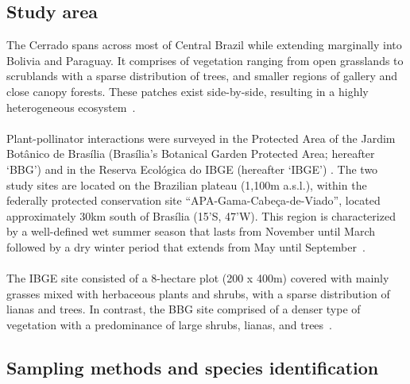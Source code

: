 \documentclass[11pt]{article}
\begin{document}
\subsection{Study area}
The Cerrado spans across most of Central Brazil while extending marginally into Bolivia and Paraguay. It comprises of vegetation ranging from open grasslands to scrublands with a sparse distribution of trees, and smaller regions of gallery and close canopy forests. These patches exist side-by-side, resulting in a highly heterogeneous ecosystem~\citep{Gottsberger2006}. \\
\\
Plant-pollinator interactions were surveyed in the Protected Area of the Jardim Bot\^anico de Bras\'ilia (Bras\'ilia's Botanical Garden Protected Area; hereafter `BBG') and in the Reserva Ecol\'ogica do IBGE (hereafter `IBGE') . The two study sites are located on the Brazilian plateau (1,100m a.s.l.), within the federally protected conservation site ``APA-Gama-Cabe\c ca-de-Viado'', located approximately 30km south of Bras\'ilia (15'S, 47'W). This region is characterized by a well-defined wet summer season that lasts from November until March followed by a dry winter period that extends from May until September~\citep{Gottsberger2006a}.\\
\\
The IBGE site consisted of a 8-hectare plot (200 x 400m) covered with mainly grasses mixed with herbaceous plants and shrubs, with a sparse distribution of lianas and trees. In contrast, the BBG site comprised of a denser type of vegetation with a predominance of large shrubs, lianas, and trees~\citep{Eiten1972}.

\subsection{Sampling methods and species identification}
\end{document}

